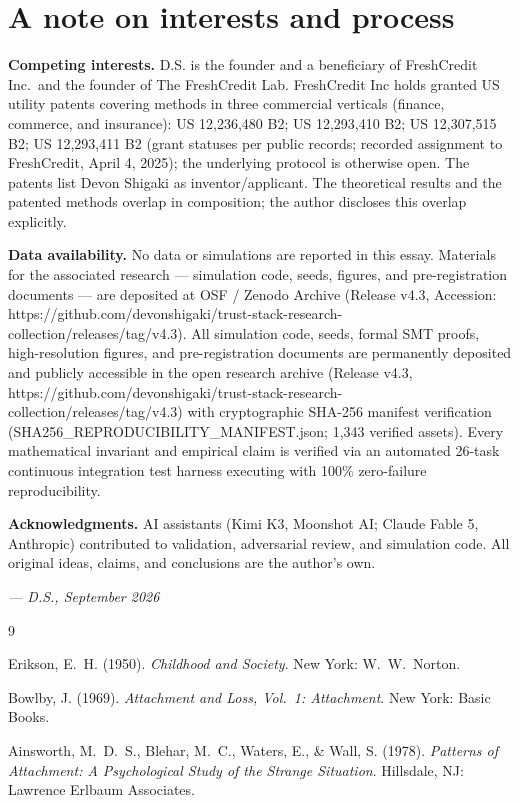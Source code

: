 \documentclass[
]{article}
\begin{document}
\section{A note on interests and
process}\label{a-note-on-interests-and-process}

\textbf{Competing interests.} D.S. is the founder and a beneficiary of
FreshCredit Inc.~and the founder of The FreshCredit Lab. FreshCredit Inc
holds granted US utility patents covering methods in three commercial
verticals (finance, commerce, and insurance): US 12,236,480 B2; US
12,293,410 B2; US 12,307,515 B2; US 12,293,411 B2 (grant statuses per
public records; recorded assignment to FreshCredit, April 4, 2025); the
underlying protocol is otherwise open. The patents list Devon Shigaki as
inventor/applicant. The theoretical results and the patented methods
overlap in composition; the author discloses this overlap explicitly.

\textbf{Data availability.} No data or simulations are reported in this
essay. Materials for the associated research --- simulation code, seeds,
figures, and pre-registration documents --- are deposited at OSF /
Zenodo Archive (Release v4.3, Accession:
https://github.com/devonshigaki/trust-stack-research-collection/releases/tag/v4.3).
All simulation code, seeds, formal SMT proofs, high-resolution figures,
and pre-registration documents are permanently deposited and publicly
accessible in the open research archive (Release v4.3,
https://github.com/devonshigaki/trust-stack-research-collection/releases/tag/v4.3)
with cryptographic SHA-256 manifest verification
(SHA256\_REPRODUCIBILITY\_MANIFEST.json; 1,343 verified assets). Every
mathematical invariant and empirical claim is verified via an automated
26-task continuous integration test harness executing with 100\%
zero-failure reproducibility.

\textbf{Acknowledgments.} AI assistants (Kimi K3, Moonshot AI; Claude
Fable 5, Anthropic) contributed to validation, adversarial review, and
simulation code. All original ideas, claims, and conclusions are the
author's own.

\emph{--- D.S., September 2026}

9

Erikson, E.~H. (1950). \emph{Childhood and Society}. New York:
W.~W.~Norton.

Bowlby, J. (1969). \emph{Attachment and Loss, Vol.~1: Attachment}. New
York: Basic Books.

Ainsworth, M.~D.~S., Blehar, M.~C., Waters, E., \& Wall, S. (1978).
\emph{Patterns of Attachment: A Psychological Study of the Strange
Situation}. Hillsdale, NJ: Lawrence Erlbaum Associates.
\end{document}
